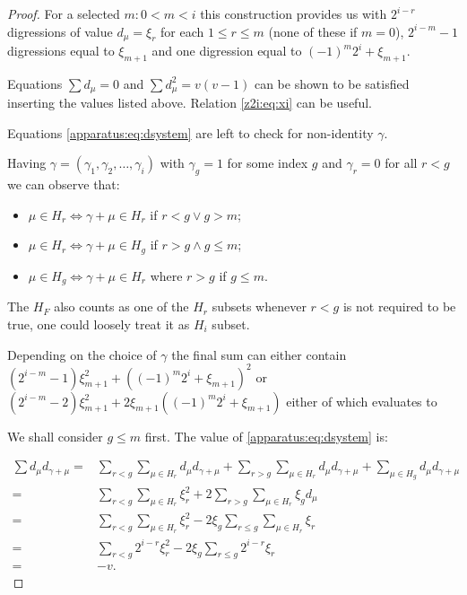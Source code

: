 \begin{proof}
	For a selected $m \colon 0 < m < i$ this construction provides us with $2^{i-r}$ digressions of value $d_\mu=\xi_r$ for each $1 \leq r\leq m$ (none of these if $m=0$), $2^{i-m}-1$ digressions equal to $\xi_{m+1}$ and one digression equal to $(-1)^m 2^i+\xi_{m+1}$.
    
    Equations $\sum d_\mu = 0$ and $\sum d_\mu^2 = v(v-1)$ can be shown to be satisfied inserting the values listed above. Relation \eqref{z2i:eq:xi} can be useful.
    
    Equations \eqref{apparatus:eq:dsystem} are left to check for non-identity $\gamma$.
    
    Having $\gamma = (\gamma_1, \gamma_2, \ldots, \gamma_i)$ with $\gamma_g = 1$ for some index $g$ and $\gamma_r = 0$ for all $r < g$ we can observe that:
    \begin{itemize}
        \item $\mu \in H_r \iff \gamma + \mu \in H_r$ if $r < g \lor g > m$;
        \item $\mu \in H_r \iff \gamma + \mu \in H_g$ if $r > g \land g \leq m$;
        \item $\mu \in H_g \iff \gamma + \mu \in H_r$ where $r>g$ if $g \leq m$.
    \end{itemize}
    
    The $H_F$ also counts as one of the $H_r$ subsets whenever $r<g$ is not required to be true, one could loosely treat it as $H_i$ subset.
    
    Depending on the choice of $\gamma$ the final sum can either contain $(2^{i-m}-1) \xi_{m+1}^2 + ((-1)^m 2^i + \xi_{m+1})^2$ or $(2^{i-m}-2) \xi_{m+1}^2 + 2\xi_{m+1}((-1)^m 2^i + \xi_{m+1})$ either of which evaluates to 
    
    We shall consider $g\leq m$ first. The value of \eqref{apparatus:eq:dsystem} is:
    
    \begin{equation}
        \begin{split}
            \sum d_\mu d_{\gamma+\mu}
              = & \sum\limits_{r<g} \sum\limits_{\mu \in H_r} d_\mu d_{\gamma + \mu}
                + \sum\limits_{r>g} \sum\limits_{\mu \in H_r} d_\mu d_{\gamma + \mu}
                + \sum\limits_{\mu \in H_g} d_\mu d_{\gamma + \mu} \\
              = & \sum\limits_{r<g} \sum\limits_{\mu \in H_r} \xi_r^2
                + 2\sum\limits_{r>g} \sum\limits_{\mu \in H_r} \xi_g d_\mu \\
              = & \sum\limits_{r<g} \sum\limits_{\mu \in H_r} \xi_r^2
                - 2 \xi_g \sum\limits_{r \leq g} \sum\limits_{\mu \in H_r} \xi_r \\
              = & \sum\limits_{r<g} 2^{i-r} \xi_r^2
                - 2 \xi_g \sum\limits_{r \leq g}  2^{i-r} \xi_r \\
              = & - v.
        \end{split}
    \end{equation}
    

\end{proof}

